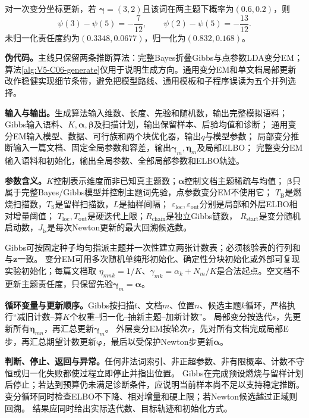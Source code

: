 对一次变分坐标更新，若
$\boldsymbol\gamma=(3,2)$且该词在两主题下概率为$(0.6,0.2)$，则
\[
\psi(3)-\psi(5)=-\frac7{12},\qquad
\psi(2)-\psi(5)=-\frac{13}{12}.
\]
未归一化责任度约为$(0.3348,0.0677)$，归一化为$(0.832,0.168)$。


\label{struct:V5-C06-CH19}
\textbf{伪代码。}主线只保留两条推断算法：完整Bayes折叠Gibbs与点参数LDA变分EM；算法\ref{alg:V5-C06-generate}仅用于说明生成方向。通用变分EM和单文档局部更新改作稳健实现细节条带，避免把模型路线、通用模板和子程序误读为五个并列选择。

\label{struct:V5-C06-CH20}
\textbf{输入与输出。}生成算法输入维数、长度、先验和随机数，输出完整模拟语料；
Gibbs输入语料、$K,\boldsymbol\alpha,\boldsymbol\beta$及扫描计划，输出保留样本、后验均值和诊断；
通用变分EM输入模型、数据、可行族和两个块优化器，输出$q$与模型参数；
局部变分推断输入一篇文档、固定全局参数和容差，输出$\boldsymbol\gamma_m,\boldsymbol\eta_m$及局部ELBO；
完整变分EM输入语料和初始化，输出全局参数、全部局部参数和ELBO轨迹。

\label{struct:V5-C06-CH21}
\textbf{参数含义。}$K$控制表示维度而非已知真主题数；$\boldsymbol\alpha$控制文档主题稀疏与均值；
$\boldsymbol\beta$只属于完整Bayes/Gibbs模型并控制主题词先验，点参数变分EM不使用它；
$T_{\mathrm B}$是燃烧扫描数，$T_{\mathrm S}$是留样扫描数，$L$是抽样间隔；
$\varepsilon_{\mathrm{loc}},\varepsilon_{\mathrm{out}}$分别是局部和外层ELBO相对增量阈值；
$T_{\mathrm{loc}},T_{\mathrm{out}}$是硬迭代上限；$R_{\mathrm{chain}}$是独立Gibbs链数，
$R_{\mathrm{start}}$是变分随机启动数，$J_{\mathrm{ls}}$是每次Newton更新的最大回溯候选数。

\label{struct:V5-C06-CH22}
\begin{implementationbox}
Gibbs可按固定种子均匀指派主题并一次性建立两张计数表；必须核验表的行列和与$\boldsymbol z$一致。
变分EM可用多次随机单纯形初始化、确定性分块初始化或外部可复现实验初始化；每篇文档取
$\eta_{mnk}=1/K$、$\gamma_{mk}=\alpha_k+N_m/K$是合法起点。空文档不更新主题责任度，只保留先验$\boldsymbol\gamma_m=\boldsymbol\alpha$。

\label{struct:V5-C06-CH23}
\textbf{循环变量与更新顺序。}Gibbs按扫描$t$、文档$m$、位置$n$、候选主题$k$循环，严格执行“减旧计数--算$K$个权重--归一化--抽新主题--加新计数”。
局部变分按迭代$s$，先更新所有$\boldsymbol\eta_{mn}$，再汇总更新$\boldsymbol\gamma_m$。
外层变分EM按轮次$r$，先对所有文档完成局部E步，再汇总期望计数更新$\boldsymbol\varphi$，最后以受保护Newton步更新$\boldsymbol\alpha$。

\label{struct:V5-C06-CH24}
\textbf{判断、停止、返回与异常。}任何非法词索引、非正超参数、非有限概率、计数不守恒或归一化失败都使过程立即停止并指出位置。
Gibbs在完成预设燃烧与留样计划后停止；若达到预算仍未满足诊断条件，应说明当前样本尚不足以支持稳定推断。变分循环同时检查ELBO不下降、相对增量和硬上限；若Newton候选越过正域则回溯。
结果应同时给出实际迭代数、目标轨迹和初始化方式。
\end{implementationbox}

